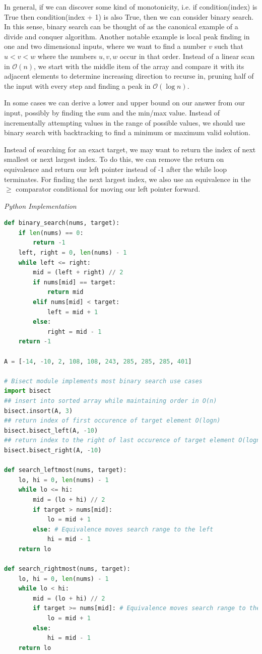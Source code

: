 \documentclass{article}
\newcommand{\bigO}{\mathcal{O}}
\begin{document}
    In general, if we can discover some kind of monotonicity, i.e. if condition(index) is True then condition(index + 1) is also True, then we can consider binary search. In this sense, binary search can be thought of as the canonical example of a divide and conquer algorithm. Another notable example is local peak finding in one and two dimensional inputs, where we want to find a number $v$ such that $u < v < w$ where the numbers $u,v,w$ occur in that order. Instead of a linear scan in $\bigO(n)$, we start with the middle item of the array and compare it with its adjacent elements to determine increasing direction to recurse in, pruning half of the input with every step and finding a peak in $\bigO(\log n)$.
    
    In some cases we can derive a lower and upper bound on our answer from our input, possibly by finding the sum and the min/max value. Instead of incrementally attempting values in the range of possible values, we should use binary search with backtracking to find a minimum or maximum valid solution.
    
    Instead of searching for an exact target, we may want to return the index of next smallest or next largest index. To do this, we can remove the return on equivalence and return our left pointer instead of -1 after the while loop terminates. For finding the next largest index, we also use an equivalence in the $\geq$ comparator conditional for moving our left pointer forward.
    
\vspace{8pt} \emph{Python Implementation}
\begin{lstlisting}[language=Python]
def binary_search(nums, target):
    if len(nums) == 0:
        return -1
    left, right = 0, len(nums) - 1
    while left <= right:
        mid = (left + right) // 2
        if nums[mid] == target:
            return mid
        elif nums[mid] < target:
            left = mid + 1
        else: 
            right = mid - 1
    return -1

A = [-14, -10, 2, 108, 108, 243, 285, 285, 285, 401]

# Bisect module implements most binary search use cases
import bisect
## insert into sorted array while maintaining order in O(n)
bisect.insort(A, 3)
## return index of first occurence of target element O(logn)
bisect.bisect_left(A, -10)
## return index to the right of last occurence of target element O(logn)
bisect.bisect_right(A, -10)

def search_leftmost(nums, target):
    lo, hi = 0, len(nums) - 1
    while lo <= hi: 
        mid = (lo + hi) // 2
        if target > nums[mid]:
            lo = mid + 1
        else: # Equivalence moves search range to the left
            hi = mid - 1
    return lo
    
def search_rightmost(nums, target):
    lo, hi = 0, len(nums) - 1
    while lo < hi:
        mid = (lo + hi) // 2
        if target >= nums[mid]: # Equivalence moves search range to the right
            lo = mid + 1
        else:
            hi = mid - 1
    return lo 
\end{lstlisting}
    
\end{document}
